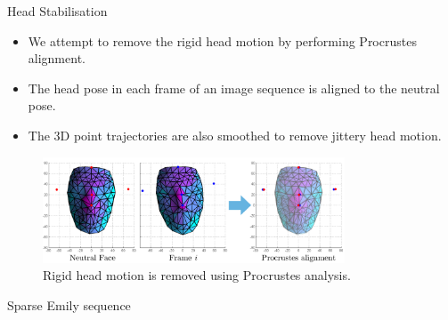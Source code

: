 \documentclass{beamer}
\begin{document}
\begin{frame}{Head Stabilisation}

\begin{itemize}
\setlength\itemsep{0.5em}
\item We attempt to remove the rigid head motion by performing Procrustes alignment.
\item The head pose in each frame of an image sequence is aligned to the neutral pose. 
\item The 3D point trajectories are also smoothed to remove jittery head motion. 
\end{itemize}

\begin{center}
\begin{figure}
\includegraphics[width=0.8\textwidth]{img/procrustes}
\caption{\tiny{Rigid head motion is removed using Procrustes analysis.}}
\end{figure}
\end{center}

\end{frame}

\begin{frame}{Sparse Emily sequence}
\begin{center}
\begin{figure}
\end{figure}
\end{center}
\end{frame}
\end{document}
